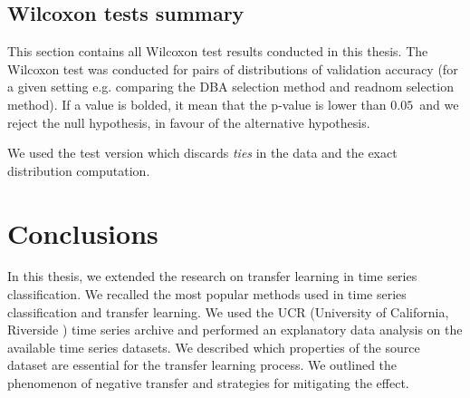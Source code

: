 \documentclass[a4paper,11pt,twoside]{report}
\theoremstyle{definition}
\begin{document}
\section{Wilcoxon tests summary}\label{section:tests}
This section contains all Wilcoxon test results conducted in this thesis. The Wilcoxon test was conducted for pairs of distributions of validation accuracy (for a given setting e.g. comparing the DBA selection method and readnom selection method). If a value is bolded, it mean that the p-value is lower than $0.05$~and we reject the null hypothesis, in favour of the alternative hypothesis.

We used the test version which discards \textit{ties} in the data and the exact distribution computation.

\begin{table}[!h]
\caption{Summary of statistical tests.}
\centering
\tabcolsep=0.11cm
\label{table:tests}
\end{table}
\chapter{Conclusions}

In this thesis, we extended the research on transfer learning in time series classification. We recalled the most popular methods used in time series classification and transfer learning. We used the UCR (University of California, Riverside \cite{UCR_archive}) time series archive and performed an explanatory data analysis on the available time series datasets. We described which properties of the source dataset are essential for the transfer learning process. We outlined the phenomenon of negative transfer and strategies for mitigating the effect.
\end{document}
